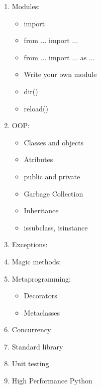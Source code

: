 \documentclass[14pt, a4paper]{article}
\begin{document}
\begin{enumerate}
		\item Modules:
		\begin{itemize}
			\item import
			\item from ... import ...
			\item from ... import ... as ...
			\item Write your own module 
			\item dir()
			\item reload()
		\end{itemize}
		
		\item OOP:
		\begin{itemize}
			\item Classes and objects
			\item Atributes
			\item public and private
			\item Garbage Collection
			\item Inheritance
			\item issubclass, isinstance
		\end{itemize}
		
		\item Exceptions:
		
		\item Magic methods:
		
		\item Metaprogramming:
		\begin{itemize}
			\item Decorators
			\item Metaclasses
		\end{itemize}
		
		\item Concurrency
		
		\item Standard library
		
		\item Unit testing
		
		\item High Performance Python
		
	\end{enumerate}
\end{document}
